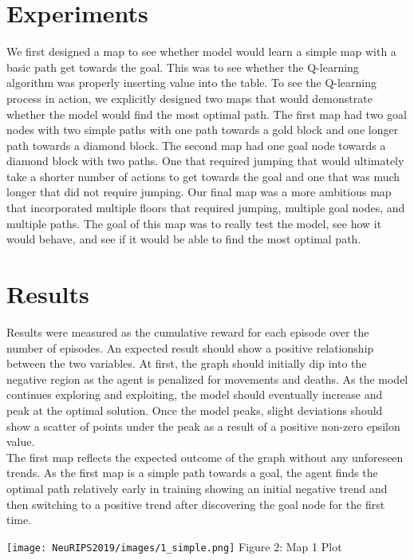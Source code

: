 \documentclass{article}
\begin{document}
\section{Experiments}

We first designed a map to see whether model would learn a simple map with a basic path get towards the goal. This was to see whether the Q-learning algorithm was properly inserting value into the table. To see the Q-learning process in action, we explicitly designed two maps that would demonstrate whether the model would find the most optimal path. The first map had two goal nodes with two simple paths with one path towards a gold block and one longer path towards a diamond block. The second map had one goal node towards a diamond block with two paths. One that required jumping that would ultimately take a shorter number of actions to get towards the goal and one that was much longer that did not require jumping. Our final map was a more ambitious map that incorporated multiple floors that required jumping, multiple goal nodes, and multiple paths. The goal of this map was to really test the model, see how it would behave, and see if it would be able to find the most optimal path. 

\section{Results}

Results were measured as the cumulative reward for each episode over the number of episodes. An expected result should show a positive relationship between the two variables. At first, the graph should initially dip into the negative region as the agent is penalized for movements and deaths. As the model continues exploring and exploiting, the model should eventually increase and peak at the optimal solution. Once the model peaks, slight deviations should show a scatter of points under the peak as a result of a positive non-zero epsilon value. \\
The first map reflects the expected outcome of the graph without any unforeseen trends. As the first map is a simple path towards a goal, the agent finds the optimal path relatively early in training showing an initial negative trend and then switching to a positive trend after discovering the goal node for the first time. \\
\begin{center}
    \texttt{[image: NeuRIPS2019/images/1\_simple.png]}
    \center Figure 2: Map 1 Plot
\end{center}
\end{document}
